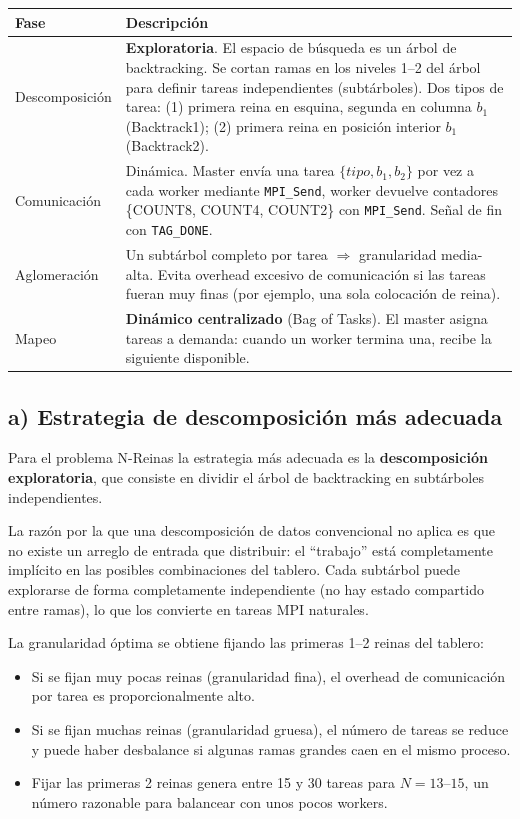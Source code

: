 \documentclass[12pt,a4paper]{article}
\begin{document}
\begin{tabular}{L{3cm} L{11cm}}
\toprule
\textbf{Fase} & \textbf{Descripción} \\
\midrule
Descomposición & \textbf{Exploratoria}. El espacio de búsqueda es un árbol de
  backtracking. Se cortan ramas en los niveles 1--2 del árbol para definir
  tareas independientes (subtárboles). Dos tipos de tarea:
  (1) primera reina en esquina, segunda en columna $b_1$ (Backtrack1);
  (2) primera reina en posición interior $b_1$ (Backtrack2). \\[4pt]
Comunicación & Dinámica. Master envía una tarea $\{tipo, b_1, b_2\}$ por vez a
  cada worker mediante \texttt{MPI\_Send}, worker devuelve contadores
  \{COUNT8, COUNT4, COUNT2\} con \texttt{MPI\_Send}. Señal de fin con
  \texttt{TAG\_DONE}. \\[4pt]
Aglomeración & Un subtárbol completo por tarea $\Rightarrow$ granularidad
  media-alta. Evita overhead excesivo de comunicación si las tareas fueran
  muy finas (por ejemplo, una sola colocación de reina). \\[4pt]
Mapeo & \textbf{Dinámico centralizado} (Bag of Tasks). El master asigna tareas
  a demanda: cuando un worker termina una, recibe la siguiente disponible. \\
\bottomrule
\end{tabular}

\vspace{0.5cm}

\subsection{a) Estrategia de descomposición más adecuada}

Para el problema N-Reinas la estrategia más adecuada es la \textbf{descomposición
exploratoria}, que consiste en dividir el árbol de backtracking en subtárboles
independientes.

La razón por la que una descomposición de datos convencional no aplica es que no
existe un arreglo de entrada que distribuir: el ``trabajo'' está completamente
implícito en las posibles combinaciones del tablero. Cada subtárbol puede explorarse
de forma completamente independiente (no hay estado compartido entre ramas), lo que
los convierte en tareas MPI naturales.

La granularidad óptima se obtiene fijando las primeras 1--2 reinas del tablero:
\begin{itemize}
  \item Si se fijan muy pocas reinas (granularidad fina), el overhead de comunicación
    por tarea es proporcionalmente alto.
  \item Si se fijan muchas reinas (granularidad gruesa), el número de tareas se
    reduce y puede haber desbalance si algunas ramas grandes caen en el mismo proceso.
  \item Fijar las primeras 2 reinas genera entre 15 y 30 tareas para $N = 13$--$15$,
    un número razonable para balancear con unos pocos workers.
\end{itemize}
\end{document}
